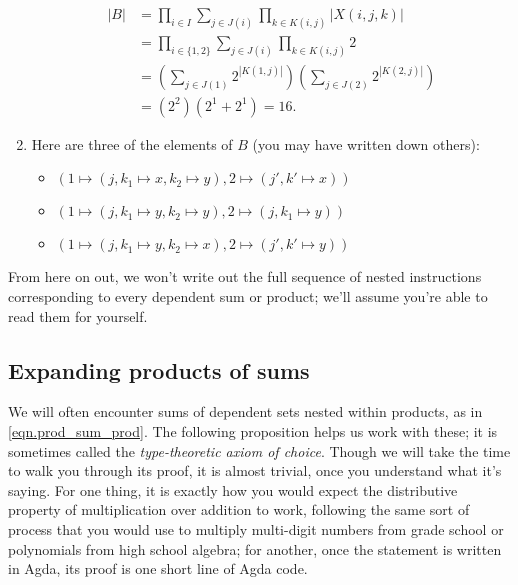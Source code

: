 \documentclass[Book-Poly]{subfiles}
\begin{document}
\begin{exercise}
\begin{solution}
\begin{enumerate}
\begin{align*}
	    |B| &= \prod_{i\in I}\sum_{j\in J(i)}\prod_{k\in K(i,j)}|X(i,j,k)| \\
	    &= \prod_{i\in \{1,2\}}\sum_{j\in J(i)}\prod_{k\in K(i,j)}2 \\
	    &= \left(\sum_{j\in J(1)} 2^{|K(1,j)|}\right)\left(\sum_{j\in J(2)} 2^{|K(2,j)|}\right) \\
	    &= \left(2^2\right)\left(2^1 + 2^1\right) = 16.
	\end{align*}
	\item Here are three of the elements of $B$ (you may have written down others):
	\begin{itemize}
	    \item $(1 \mapsto (j, k_1 \mapsto x, k_2 \mapsto y), 2 \mapsto (j', k' \mapsto x))$
	    \item $(1 \mapsto (j, k_1 \mapsto y, k_2 \mapsto y), 2 \mapsto (j, k_1 \mapsto y))$
	    \item $(1 \mapsto (j, k_1 \mapsto y, k_2 \mapsto x), 2 \mapsto (j', k' \mapsto y))$
	\end{itemize}
\qedhere
\end{enumerate}
\end{solution}
\end{exercise}

From here on out, we won't write out the full sequence of nested instructions corresponding to every dependent sum or product; we'll assume you're able to read them for yourself.

\subsection{Expanding products of sums} \label{subsec.poly.func_nat.repr_sum.expand}

We will often encounter sums of dependent sets nested within products, as in \eqref{eqn.prod_sum_prod}.
The following proposition helps us work with these; it is sometimes called the \emph{type-theoretic axiom of choice}. Though we will take the time to walk you through its proof, it is almost trivial, once you understand what it's saying. For one thing, it is exactly how you would expect the distributive property of multiplication over addition to work, following the same sort of process that you would use to multiply multi-digit numbers from grade school or polynomials from high school algebra; for another, once the statement is written in Agda, its proof is one short line of Agda code. 
\end{document}
